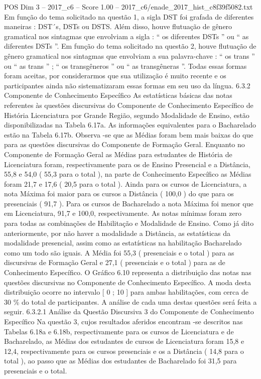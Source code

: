 \begin{textsample}{POS Dim 3 – 2017\_c6 – Score 1.00 – 2017\_c6/enade\_2017\_hist\_c8f39f5082.txt}
Em função do tema solicitado na questão 1, a sigla DST foi grafada de diferentes maneiras : DST´s, DSTs ou DSTS.
Além disso, houve flutuação de gênero gramatical nos sintagmas que envolviam a sigla : “ os diferentes DSTs ” ou “ as diferentes DSTs ”.
Em função do tema solicitado na questão 2, houve flutuação de gênero gramatical nos sintagmas que envolviam a sua palavra-chave : “ os trans ” ou “ as trans ” ; “ os transgêneros ” ou “ as transgêneras ”.
Todas essas formas foram aceitas, por considerarmos que sua utilização é muito recente e os participantes ainda não sistematizaram essas formas em seu uso da língua. 6.3.2 Componente de Conhecimento Específico As estatísticas básicas das notas referentes às questões discursivas do Componente de Conhecimento Específico de História Licenciatura por Grande Região, segundo Modalidade de Ensino, estão disponibilizadas na Tabela 6.17a.
As informações equivalentes para o Bacharelado estão na Tabela 6.17b.
Observa -se que as Médias foram bem mais baixas do que para as questões discursivas do Componente de Formação Geral.
Enquanto no Componente de Formação Geral as Médias para estudantes de História de Licenciatura foram, respectivamente para os de Ensino Presencial e a Distância, 55,8 e 54,0 ( 55,3 para o total ), na parte de Conhecimento Específico as Médias foram 21,7 e 17,6 ( 20,5 para o total ).
Ainda para os cursos de Licenciatura, a nota Máxima foi maior para os cursos a Distância ( 100,0 ) do que para os presenciais ( 91,7 ).
Para os cursos de Bacharelado a nota Máxima foi menor que em Licenciatura, 91,7 e 100,0, respectivamente.
As notas mínimas foram zero para todas as combinações de Habilitação e Modalidade de Ensino.
Como já dito anteriormente, por não haver a modalidade a Distância, as estatísticas da modalidade presencial, assim como as estatísticas na habilitação Bacharelado como um todo são iguais.
A Média foi 55,3 ( presenciais e o total ) para as discursivas de Formação Geral e 27,1 ( presenciais e o total ) para as de Conhecimento Específico.
O Gráfico 6.10 representa a distribuição das notas nas questões discursivas no Componente de Conhecimento Específico.
A moda desta distribuição ocorre no intervalo [ 0 ; 10 ] para ambas habilitações, com cerca de 30 \% do total de participantes.
A análise de cada uma destas questões será feita a seguir. 6.3.2.1 Análise da Questão Discursiva 3 do Componente de Conhecimento Específico Na questão 3, cujos resultados aferidos encontram -se descritos nas Tabelas 6.18a e 6.18b, respectivamente para os cursos de Licenciatura e de Bacharelado, as Médias dos estudantes de cursos de Licenciatura foram 15,8 e 12,4, respectivamente para os cursos presenciais e os a Distância ( 14,8 para o total ), ao passo que as Médias dos estudantes de Bacharelado foi 31,5 para presenciais e o total.

\end{textsample}
